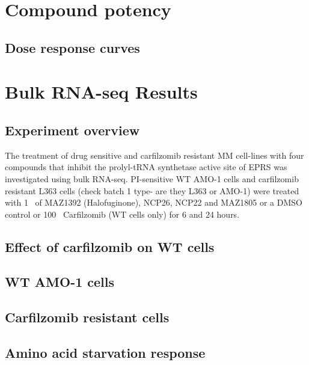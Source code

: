 \section{Compound potency}

\subsection{Dose response curves}

\section{Bulk RNA-seq Results}

\subsection{Experiment overview}
The treatment of drug sensitive and carfilzomib resistant MM cell-lines with four compounds that inhibit  the  prolyl-tRNA  synthetase  active  site  of  EPRS  was investigated using bulk RNA-seq.
PI-sensitive WT AMO-1 cells and carfilzomib resistant L363 cells (check batch 1 type- are they L363 or AMO-1) were treated with 1\si{\micro\Molar} of MAZ1392 (Halofuginone), NCP26, NCP22 and MAZ1805 or a DMSO control or 100\si{\nano\Molar} Carfilzomib (WT cells only) for 6 and 24 hours.

\subsection{Effect of carfilzomib on WT cells}

\subsection{WT AMO-1 cells}

\subsection{Carfilzomib resistant cells}


\subsection{Amino acid starvation response}



